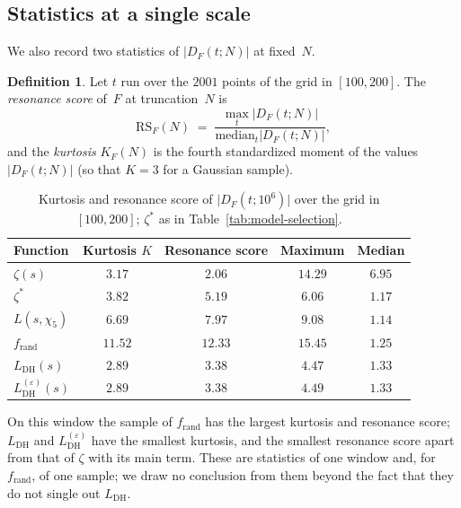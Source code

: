 \documentclass[11pt]{amsart}
\theoremstyle{definition}
\newtheorem{definition}[theorem]{Definition}
\theoremstyle{remark}
\renewcommand{\DH}{\mathrm{DH}}
\newcommand{\abs}[1]{\lvert #1 \rvert}
\begin{document}
\subsection{Statistics at a single scale}
\label{ssec:single-scale}

We also record two statistics of $\abs{D_F(t;N)}$ at fixed~$N$.

\begin{definition}\label{def:RS}
Let $t$ run over the $2001$ points of the grid in $[100,200]$.  The
\emph{resonance score} of~$F$ at truncation~$N$ is
\begin{equation}\label{eq:RS}
  \mathrm{RS}_F(N) \;=\; \frac{\max_t \abs{D_F(t;N)}}
    {\mathrm{median}_t \abs{D_F(t;N)}},
\end{equation}
and the \emph{kurtosis} $K_F(N)$ is the fourth standardized moment of
the values $\abs{D_F(t;N)}$ (so that $K=3$ for a Gaussian sample).
\end{definition}

\begin{table}[ht]
\centering
\caption{Kurtosis and resonance score of $\abs{D_F(t;10^6)}$ over the
  grid in $[100,200]$; $\zeta^\ast$ as in Table~\ref{tab:model-selection}.}
\label{tab:single-scale}
\begin{tabular}{@{}lcccc@{}}
\toprule
Function & Kurtosis $K$ & Resonance score & Maximum & Median \\
\midrule
$\zeta(s)$           & $3.17$  & $2.06$  & $14.29$ & $6.95$ \\
$\zeta^\ast$         & $3.82$  & $5.19$  & $6.06$  & $1.17$ \\
$L(s,\chi_5)$        & $6.69$  & $7.97$  & $9.08$  & $1.14$ \\
$f_{\mathrm{rand}}$  & $11.52$ & $12.33$ & $15.45$ & $1.25$ \\
$L_{\DH}(s)$         & $2.89$  & $3.38$  & $4.47$  & $1.33$ \\
$L_{\DH}^{(\varepsilon)}(s)$ & $2.89$ & $3.38$ & $4.49$ & $1.33$ \\
\bottomrule
\end{tabular}
\end{table}

On this window the sample of $f_{\mathrm{rand}}$ has the largest kurtosis
and resonance score; $L_{\DH}$ and $L_{\DH}^{(\varepsilon)}$ have the
smallest kurtosis, and the smallest resonance score apart from that of
$\zeta$ with its main term.
These are statistics of one window and, for $f_{\mathrm{rand}}$, of one
sample; we draw no conclusion from them beyond the fact that they do not
single out $L_{\DH}$.
\end{document}
